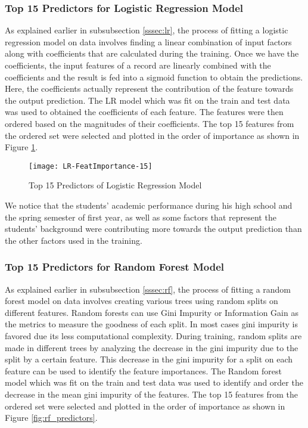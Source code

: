 \documentclass[11pt,openright]{report}
\begin{document}
\subsubsection{Top 15 Predictors for Logistic Regression Model}

As explained earlier in subsubsection \ref{sssec:lr}, the process of fitting a logistic regression model on data involves finding a linear combination of input factors along with coefficients that are calculated during the training. Once we have the coefficients, the input features of a record are linearly combined with the coefficients and the result is fed into a sigmoid function to obtain the predictions. Here, the coefficients actually represent the contribution of the feature towards the output prediction. The LR model which was fit on the train and test data was used to obtained the coefficients of each feature. The features were then ordered based on the magnitudes of their coefficients. The top 15 features from the ordered set were selected and plotted in the order of importance as shown in Figure \ref{fig:lr_predictors}.
 \begin{figure}[!ht]
	\centering
	\texttt{[image: LR-FeatImportance-15]}
	\caption{Top 15 Predictors of Logistic Regression Model}
	\label{fig:lr_predictors}
\end{figure} 

We notice that the students' academic performance during his high school and the spring semester of first year, as well as some factors that represent the students' background were contributing more towards the output prediction than the other factors used in the training.

\subsubsection{Top 15 Predictors for Random Forest Model}

As explained earlier in subsubsection \ref{sssec:rf}, the process of fitting a random forest model on data involves creating various trees using random splits on different features. Random forests can use Gini Impurity or Information Gain as the metrics to measure the goodness of each split. In most cases gini impurity is favored due its less computational complexity. During training, random splits are made in different trees by analyzing the decrease in the gini impurity due to the split by a certain feature. This decrease in the gini impurity for a split on each feature can be used to identify the feature importances. The Random forest model which was fit on the train and test data was used to identify and order the decrease in the mean gini impurity of the features. The top 15 features from the ordered set were selected and plotted in the order of importance as shown in Figure \ref{fig:rf_predictors}.
\end{document}
